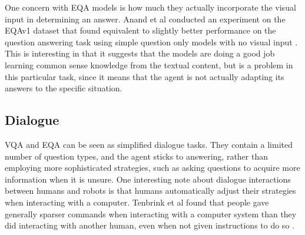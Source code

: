 One concern with EQA models is how much they actually incorporate the visual input in determining an answer. Anand et al conducted an experiment on the EQAv1 dataset that found equivalent to slightly better performance on the question answering task using simple question only models with no visual input \cite{blindfolded}. This is interesting in that it suggests that the models are doing a good job learning common sense knowledge from the textual content, but is a problem in this particular task, since it means that the agent is not actually adapting its answers to the specific situation. 

\subsection{Dialogue}
VQA and EQA can be seen as simplified dialogue tasks. They contain a limited number of question types, and the agent sticks to answering, rather than employing more sophisticated strategies, such as asking questions to acquire more information when it is unsure. One interesting note about dialogue interactions between humans and robots is that humans automatically adjust their strategies when interacting with a computer. %
Tenbrink et al found that people gave generally sparser commands when interacting with a computer system than they did interacting with another human, even when not given instructions to do so \cite{Tenbrink:2010qf}. \newline
